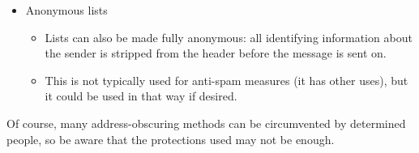 \documentclass{howto}
\begin{document}
\begin{itemize}
	\item Anonymous lists
		\begin{itemize}
			\item Lists can also be made fully anonymous: all identifying
			information about the sender is stripped from the header before the
			message is sent on.  
			\item This is not typically used for anti-spam measures (it has
			other uses), but it could be used in that way if desired.
		\end{itemize}
\end{itemize}

Of course, many address-obscuring methods can be circumvented by determined 
people, so be aware that the protections used may not be enough.

\appendix
\end{document}
